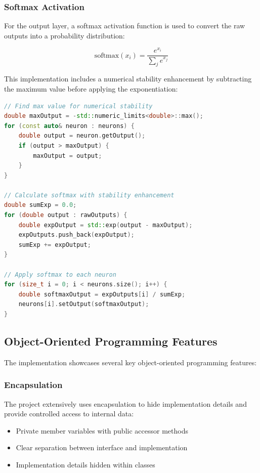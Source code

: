 \documentclass[12pt]{article}
\begin{document}
\subsubsection{Softmax Activation}

For the output layer, a softmax activation function is used to convert the raw outputs into a probability distribution:

\begin{equation}
\text{softmax}(x_i) = \frac{e^{x_i}}{\sum_{j} e^{x_j}}
\end{equation}

This implementation includes a numerical stability enhancement by subtracting the maximum value before applying the exponentiation:

\begin{lstlisting}[language=C++]
// Find max value for numerical stability
double maxOutput = -std::numeric_limits<double>::max();
for (const auto& neuron : neurons) {
    double output = neuron.getOutput();
    if (output > maxOutput) {
        maxOutput = output;
    }
}

// Calculate softmax with stability enhancement
double sumExp = 0.0;
for (double output : rawOutputs) {
    double expOutput = std::exp(output - maxOutput);
    expOutputs.push_back(expOutput);
    sumExp += expOutput;
}

// Apply softmax to each neuron
for (size_t i = 0; i < neurons.size(); i++) {
    double softmaxOutput = expOutputs[i] / sumExp;
    neurons[i].setOutput(softmaxOutput);
}
\end{lstlisting}

\subsection{Object-Oriented Programming Features}

The implementation showcases several key object-oriented programming features:

\subsubsection{Encapsulation}

The project extensively uses encapsulation to hide implementation details and provide controlled access to internal data:

\begin{itemize}
    \item Private member variables with public accessor methods
    \item Clear separation between interface and implementation
    \item Implementation details hidden within classes
\end{itemize}
\end{document}
